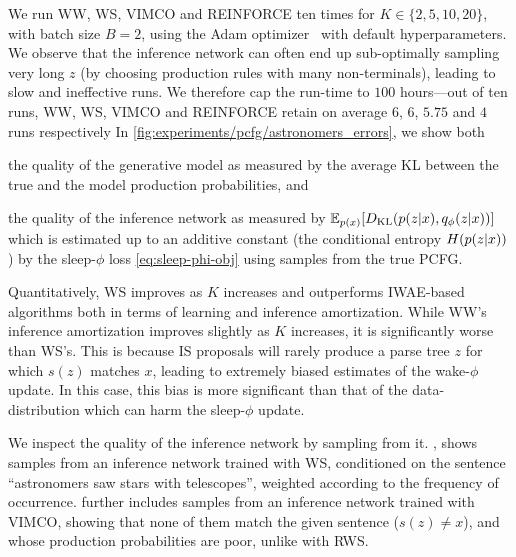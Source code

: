 We run \gls{WW}, \gls{WS}, \gls{VIMCO} and \acrshort{REINFORCE} ten times for $K \in \{2, 5, 10, 20\}$, with batch size \(B=2\), using the Adam optimizer~\citep{kingma2015adam} with default hyperparameters.
%
We observe that the inference network can often end up sub-optimally sampling very long $z$ (by choosing production rules with many non-terminals), leading to slow and ineffective runs.
%
We therefore cap the run-time to $100$ hours---out of ten runs, \gls{WW}, \gls{WS}, \gls{VIMCO} and \acrshort{REINFORCE} retain on average $6$, $6$, $5.75$ and $4$ runs respectively
%
In \cref{fig:experiments/pcfg/astronomers_errors}, we show both
%
\begin{inparaenum}[(i)]
\item the quality of the generative model as measured by the average \gls{KL} between the true and the model production probabilities, and
\item the quality of the inference network as measured by $\mathbb{E}_{p(x)}[D_{\mathrm{KL}}(p(z \lvert x), q_\phi(z \lvert x))]$ which is estimated up to an additive constant (the conditional entropy $H(p(z \lvert x))$) by the sleep-$\phi$ loss \cref{eq:sleep-phi-obj} using samples from the true \gls{PCFG}.
\end{inparaenum}

Quantitatively, \gls{WS} improves as $K$ increases and outperforms \gls{IWAE}-based algorithms both in terms of learning and inference amortization.
While \gls{WW}'s inference amortization improves slightly as $K$ increases, it is significantly worse than \gls{WS}'s.
This is because \gls{IS} proposals will rarely produce a parse tree $z$ for which $s(z)$ matches $x$, leading to extremely biased estimates of the wake-$\phi$ update.
In this case, this bias is more significant than that of the data-distribution which can harm the sleep-$\phi$ update.

%
We inspect the quality of the inference network by sampling from it.
%
, shows samples from an inference network trained with \gls{WS}, conditioned on the sentence ``astronomers saw stars with telescopes'', weighted according to the frequency of occurrence.
%
 further includes samples from an inference network trained with \gls{VIMCO}, showing that none of them match the given sentence ($s(z) \neq x$), and whose production probabilities are poor, unlike with \gls{RWS}.

